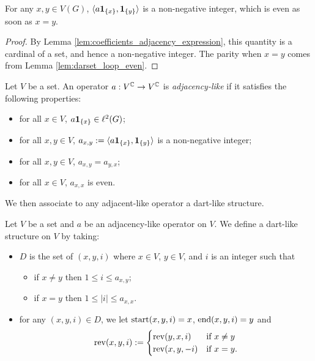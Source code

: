 \begin{lemma}
  \label{lem:coefficients_adjacency_properties}
  For any $x, y \in V(G)$,
  $\langle a \mathbf{1}_{\{x\}}, \mathbf{1}_{\{y\}} \rangle$ is a non-negative integer,
  which is even as soon as $x=y$.
\end{lemma}

\begin{proof}
  By Lemma \ref{lem:coefficients_adjacency_expression}, this quantity is a cardinal
  of a set, and hence a non-negative integer. The parity when $x=y$ comes from Lemma
  \ref{lem:darset_loop_even}.
\end{proof}

\begin{definition}
  \label{def:adjacency_like}
  Let $V$ be a set.
  An operator $a : V^{\mathbb{C}} \rightarrow V^{\mathbb{C}}$ is \emph{adjacency-like}
  if it satisfies the following properties:
  \begin{itemize}
    \item for all $x \in V$, $a \mathbf{1}_{\{x\}} \in \ell^2(G)$;
    \item for all $x, y \in V$,
    $a_{x,y} := \langle a \mathbf{1}_{\{x\}}, \mathbf{1}_{\{y\}} \rangle$ is a non-negative
    integer;
    \item for all $x, y \in V$, $a_{x,y}=a_{y,x}$;
    \item for all $x \in V$, $a_{x,x}$ is even.
  \end{itemize}
\end{definition}

We then associate to any adjacent-like operator a dart-like structure.

\begin{definition}
  \label{def:dartlike_of_adjlike}
  Let $V$ be a set and $a$ be an adjacency-like operator on $V$.
  We define a dart-like structure on $V$ by taking:
  \begin{itemize}
    \item $D$ is the set of $(x,y,i)$ where $x \in V$, $y \in V$, and $i$ is an integer such that
    \begin{itemize}
      \item if $x \neq y$ then $1 \leq i \leq a_{x,y}$;
      \item if $x=y$ then $1 \leq |i| \leq a_{x,x}$.
    \end{itemize}
    \item for any $(x,y,i) \in D$, we let $\mathrm{start}(x,y,i)=x$, $\mathrm{end}(x,y,i)=y$ and
    \begin{equation*}
      \mathrm{rev}(x,y,i) := \begin{cases}
        \mathrm{rev}(y,x,i) & \text{if } x \neq y \\
        \mathrm{rev}(x,y,-i) & \text{if } x = y.
      \end{cases}
    \end{equation*}
  \end{itemize}
\end{definition}

